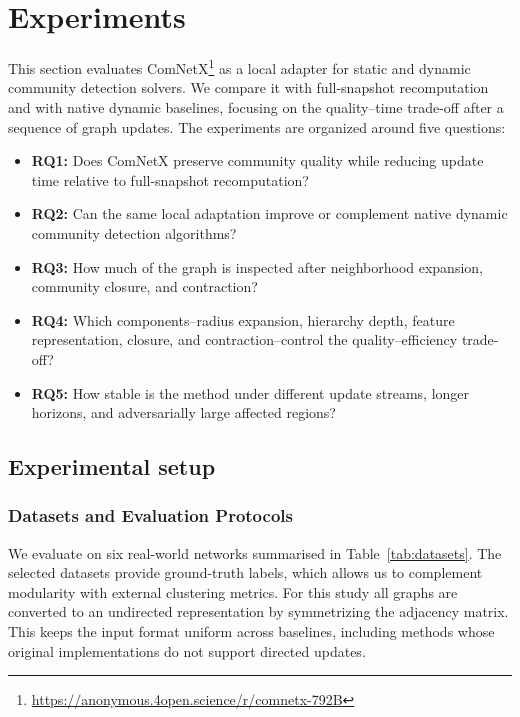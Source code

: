 \documentclass[conference]{IEEEtran}
\theoremstyle{definition}
\begin{document}

\section{Experiments} \label{S:4}

This section evaluates ComNetX\footnote{\url{https://anonymous.4open.science/r/comnetx-792B}} as a local adapter for static and dynamic
community detection solvers. We compare it with full-snapshot recomputation
and with native dynamic baselines, focusing on the quality--time trade-off
after a sequence of graph updates.
The experiments are organized around five questions:
\begin{itemize}[leftmargin=*]
    \item \textbf{RQ1:} Does ComNetX preserve community quality while reducing
    update time relative to full-snapshot recomputation?
    \item \textbf{RQ2:} Can the same local adaptation improve or complement
    native dynamic community detection algorithms?
    \item \textbf{RQ3:} How much of the graph is inspected after neighborhood
    expansion, community closure, and contraction?
    \item \textbf{RQ4:} Which components--radius expansion, hierarchy depth,
    feature representation, closure, and contraction--control the
    quality--efficiency trade-off?
    \item \textbf{RQ5:} How stable is the method under different update streams,
    longer horizons, and adversarially large affected regions?
\end{itemize}

\subsection{Experimental setup}

\subsubsection{Datasets and Evaluation Protocols}
We evaluate on six real-world networks summarised in Table~\ref{tab:datasets}.
The selected datasets provide ground-truth labels, which allows us to complement
modularity with external clustering metrics. For this study all graphs are
converted to an undirected representation by symmetrizing the adjacency matrix.
This keeps the input format uniform across baselines, including methods whose
original implementations do not support directed updates.
\end{document}
